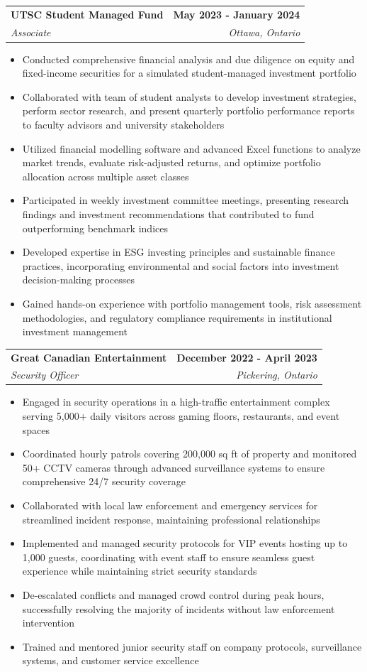 \documentclass[letterpaper,11pt]{article}
\makeatletter
\newcommand{\resumeItem}[1]{
  \item\small{
    {#1 \vspace{-2pt}}
  }
}
\newcommand{\resumeSubheading}[4]{
  \vspace{-2pt}\item
    \begin{tabular*}{1.0\textwidth}[t]{l@{\extracolsep{\fill}}r}
      \textbf{#1} & \textbf{\small #2} \\
      \textit{\small#3} & \textit{\small #4} \\
    \end{tabular*}\vspace{-7pt}
}
\newcommand{\resumeItemListStart}{\begin{itemize}}
\newcommand{\resumeItemListEnd}{\end{itemize}\vspace{-5pt}}
\makeatother
\begin{document}
    \resumeSubheading
      {UTSC Student Managed Fund}{May 2023 - January 2024}
      {Associate}{Ottawa, Ontario}
      \resumeItemListStart
        \resumeItem{Conducted comprehensive financial analysis and due diligence on equity and fixed-income securities for a simulated student-managed investment portfolio}
        \resumeItem{Collaborated with team of student analysts to develop investment strategies, perform sector research, and present quarterly portfolio performance reports to faculty advisors and university stakeholders}
        \resumeItem{Utilized financial modelling software and advanced Excel functions to analyze market trends, evaluate risk-adjusted returns, and optimize portfolio allocation across multiple asset classes}
        \resumeItem{Participated in weekly investment committee meetings, presenting research findings and investment recommendations that contributed to fund outperforming benchmark indices}
        \resumeItem{Developed expertise in ESG investing principles and sustainable finance practices, incorporating environmental and social factors into investment decision-making processes}
        \resumeItem{Gained hands-on experience with portfolio management tools, risk assessment methodologies, and regulatory compliance requirements in institutional investment management}
      \resumeItemListEnd

    \resumeSubheading
      {Great Canadian Entertainment}{December 2022 - April 2023}
      {Security Officer}{Pickering, Ontario}
      \resumeItemListStart
        \resumeItem{Engaged in security operations in a high-traffic entertainment complex serving 5,000+ daily visitors across gaming floors, restaurants, and event spaces}
        \resumeItem{Coordinated hourly patrols covering 200,000 sq ft of property and monitored 50+ CCTV cameras through advanced surveillance systems to ensure comprehensive 24/7 security coverage}
        \resumeItem{Collaborated with local law enforcement and emergency services for streamlined incident response, maintaining professional relationships}
        \resumeItem{Implemented and managed security protocols for VIP events hosting up to 1,000 guests, coordinating with event staff to ensure seamless guest experience while maintaining strict security standards}
        \resumeItem{De-escalated conflicts and managed crowd control during peak hours, successfully resolving the majority of incidents without law enforcement intervention}
        \resumeItem{Trained and mentored junior security staff on company protocols, surveillance systems, and customer service excellence}
      \resumeItemListEnd
    
\end{document}
